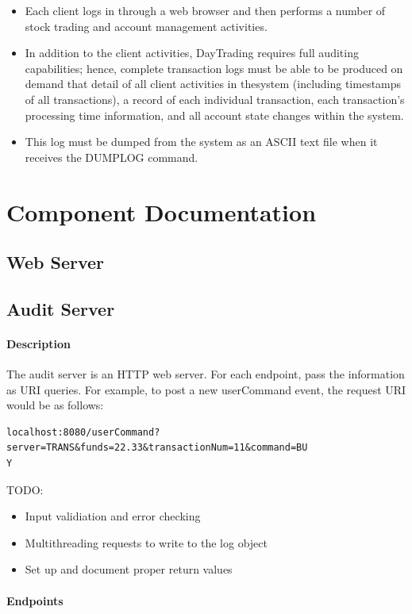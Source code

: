 \documentclass[a4paper,10pt]{article}
\begin{document}
\begin{itemize}
\item Each client logs in through a web browser and then performs a number of 
stock trading and account management activities.
\item In addition to the client activities, DayTrading requires full auditing 
capabilities; hence, complete transaction logs must be able to be produced on 
demand that detail of all client activities in thesystem (including timestamps 
of all transactions), a record of each individual transaction, each 
transaction’s processing time information, and all account state changes within 
the system. 
\item This log must be dumped from the system as an ASCII text file when it 
receives the DUMPLOG command.
 
\end{itemize}

\section{Component Documentation}
\subsection{Web Server}
\subsection{Audit Server}
\paragraph{Description}

The audit server is an HTTP web server. For each endpoint, pass the information 
as URI queries. For example, to post a new userCommand event, the request URI 
would be as follows:

\begin{verbatim}
localhost:8080/userCommand?server=TRANS&funds=22.33&transactionNum=11&command=BU 
Y\end{verbatim}

TODO:
\begin{itemize}
 \item Input validiation and error checking
 \item Multithreading requests to write to the log object
 \item Set up and document proper return values
\end{itemize}

\paragraph{Endpoints}
\end{document}
